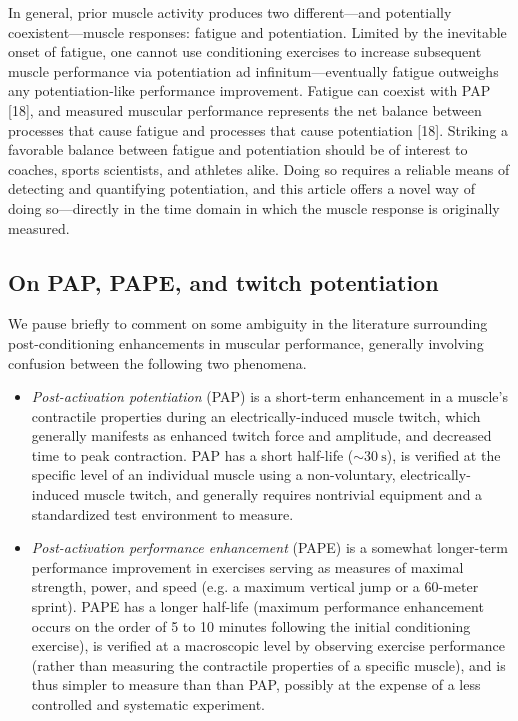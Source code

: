 \documentclass[utf8]{style/FrontiersinHarvard}
\begin{document}
In general, prior muscle activity produces two different---and potentially coexistent---muscle responses: fatigue and potentiation.
Limited by the inevitable onset of fatigue, one cannot use conditioning exercises to increase subsequent muscle performance via potentiation ad infinitum---eventually fatigue outweighs any potentiation-like performance improvement.
Fatigue can coexist with PAP [18], and measured muscular performance represents the net balance between processes that cause fatigue and processes that cause potentiation [18].
Striking a favorable balance between fatigue and potentiation should be of interest to coaches, sports scientists, and athletes alike.
Doing so requires a reliable means of detecting and quantifying potentiation, and this article offers a novel way of doing so---directly in the time domain in which the muscle response is originally measured.

\subsection{On PAP, PAPE, and twitch potentiation}
We pause briefly to comment on some ambiguity in the literature surrounding post-conditioning enhancements in muscular performance,
generally involving confusion between the following two phenomena.
\begin{itemize}

    \item \textit{Post-activation potentiation} (PAP) is a short-term enhancement in a muscle's contractile properties during an electrically-induced muscle twitch, which generally manifests as enhanced twitch force and amplitude, and decreased time to peak contraction.
    PAP has a short half-life ($ \sim \SI{30}{\second} $),
    is verified at the specific level of an individual muscle using a non-voluntary, electrically-induced muscle twitch, and generally requires nontrivial equipment and a standardized test environment to measure.

    \item \textit{Post-activation performance enhancement} (PAPE) is
    a somewhat longer-term performance improvement in exercises serving as measures of maximal strength, power, and speed (e.g. a maximum vertical jump or a 60-meter sprint).
    PAPE has a longer half-life (maximum performance enhancement occurs on the order of 5 to 10 minutes following the initial conditioning exercise),
    is verified at a macroscopic level by observing exercise performance (rather than measuring the contractile properties of a specific muscle),
    and is thus simpler to measure than than PAP, possibly at the expense of a less controlled and systematic experiment.

\end{itemize}
\end{document}
